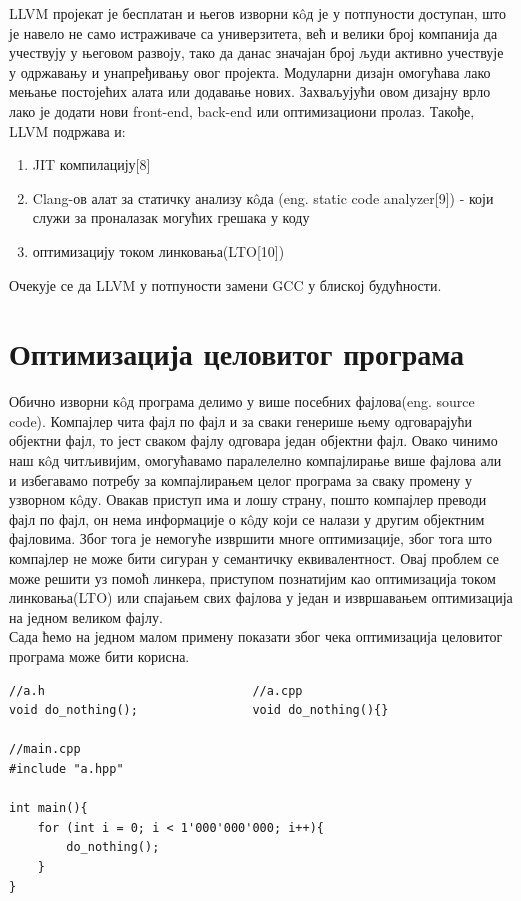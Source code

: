 \documentclass[12pt,oneside]{memoir}
\begin{document}
LLVM пројекат је бесплатан и његов изворни к\^{o}д је у потпуности доступан, 
што је навело не само истраживаче са универзитета, већ и велики број компанија 
да учествују у његовом развоју, тако да данас значајан број људи активно 
учествује у одржавању и унапређивању овог пројекта.
Модуларни дизајн омогућава лако мењање постојећих алата или додавање нових.
Захваљујући овом дизајну врло лако је додати нови front-end, back-end или
оптимизациони пролаз.
Такође, LLVM подржава и:
\begin{enumerate}
\item JIT компилацију[8]
\item Clang-ов алат за статичку анализу к\^{o}да (eng. static code analyzer[9]) 
- који служи за  проналазак могућих грешака у коду
\item оптимизацију током линковања(LTO[10])
\end{enumerate}
 Очекује се да LLVM у потпуности замени GCC у блиској будућности.

\chapter{Оптимизација целовитог програма}

Обично изворни к\^{o}д програма делимо у више посебних фајлова(eng. source code).
Компајлер чита фајл по фајл и за сваки генерише њему одговарајући објектни фајл,
то јест сваком фајлу одговара један објектни фајл.
Овако чинимо наш к\^{o}д читљивијим, омогућавамо паралелелно компајлирање више 
фајлова али и избегавамо потребу за компајлирањем целог програма за сваку промену
у узворном к\^{o}ду.
Овакав приступ има и лошу страну, пошто компајлер преводи фајл по фајл, он нема 
информације о к\^{o}ду који се налази у другим објектним фајловима.
Због тога је немогуће извршити многе оптимизације, због тога што компајлер не може 
бити сигуран у семантичку еквивалентност.
Овај проблем се може решити уз помоћ линкера, приступом познатијим као 
оптимизација током линковања(LTO) или спајањем свих фајлова у један и извршавањем
оптимизација на једном великом фајлу.
\\
Сада ћемо на једном малом примену показати због чека оптимизација целовитог програма 
може бити корисна.

\begin{lstlisting}
//a.h                             //a.cpp
void do_nothing();                void do_nothing(){} 

//main.cpp          
#include "a.hpp"

int main(){
    for (int i = 0; i < 1'000'000'000; i++){
        do_nothing();
    }
}
\end{lstlisting}
\end{document}
